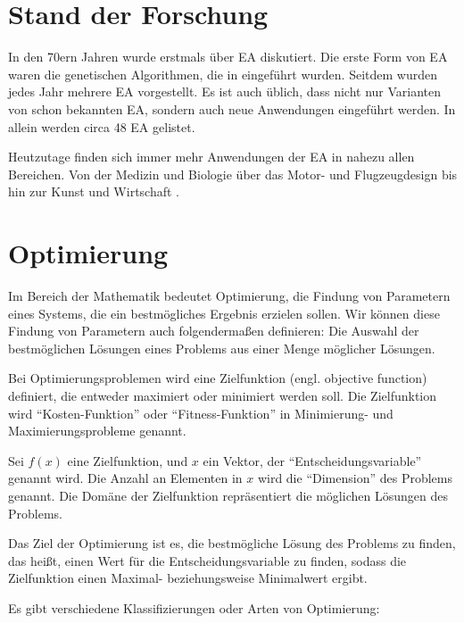 \documentclass[twoside,twocolumn]{article}
\begin{document}

\section{Stand der Forschung}
In den 70ern Jahren wurde erstmals über EA diskutiert. Die erste Form von EA waren die genetischen Algorithmen, die in \cite{holland_ga} eingeführt wurden. Seitdem wurden jedes Jahr mehrere EA vorgestellt. Es ist auch üblich, dass nicht nur Varianten von schon bekannten EA, sondern auch neue Anwendungen eingeführt werden. In \cite{algorithmen_list} allein werden circa 48 EA gelistet.\par
Heutzutage finden sich immer mehr Anwendungen der EA in nahezu allen Bereichen. Von der Medizin \cite{ea_und_medizin} und Biologie \cite{ea_und_biologie} über das Motor- \cite{ea_und_motoren} und Flugzeugdesign \cite{ea_und_flugzeuge_a} \cite{ea_und_flugzeuge_b} bis hin zur Kunst \cite{ea_und_kunst_a} \cite{ea_und_kunst_b} und Wirtschaft \cite{ea_und_wirtschaft}.


\section{Optimierung}
Im Bereich der Mathematik bedeutet Optimierung, die Findung von Parametern eines Systems, die ein bestmögliches Ergebnis erzielen sollen. \cite{wiki_optimierung} Wir können diese Findung von Parametern auch folgendermaßen definieren: Die Auswahl der bestmöglichen Lösungen eines Problems aus einer Menge möglicher Lösungen.\par
Bei Optimierungsproblemen wird eine Zielfunktion (engl. objective function) definiert, die entweder maximiert oder minimiert werden soll. Die Zielfunktion wird \enquote{Kosten-Funktion} oder \enquote{Fitness-Funktion} in Minimierung- und Maximierungsprobleme genannt.\par
Sei $f(x)$ eine Zielfunktion, und $x$ ein Vektor, der \enquote{Entscheidungsvariable} genannt wird. Die Anzahl an Elementen in $x$ wird die \enquote{Dimension} des Problems genannt.
Die Domäne der Zielfunktion repräsentiert die möglichen Lösungen des Problems. \par
Das Ziel der Optimierung ist es, die bestmögliche Lösung des Problems zu finden, das heißt, einen Wert für die Entscheidungsvariable zu finden, sodass die Zielfunktion einen Maximal- beziehungsweise Minimalwert ergibt.\par
Es gibt verschiedene Klassifizierungen oder Arten von Optimierung:
\end{document}
